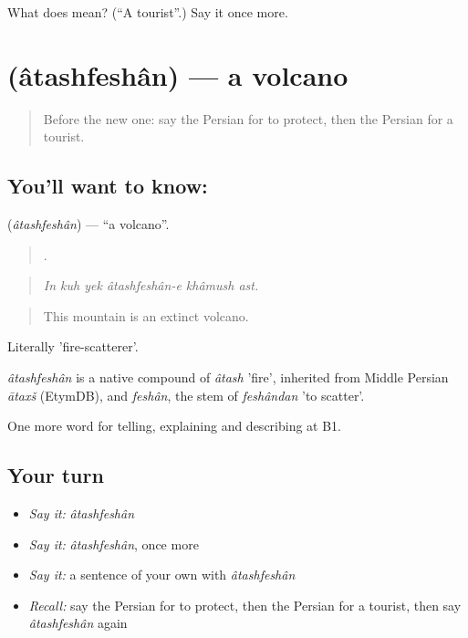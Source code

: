 \begin{tcolorbox}[breakable,colback=teal!4,colframe=teal!35!black,title={Before you move on}]
What does  mean? (\textquotedblleft{}A tourist\textquotedblright{}.) Say it once more.
\end{tcolorbox}
\section[\texorpdfstring{\fa{آتشفشان} (âtashfeshân)}{آتشفشان (âtashfeshân)}]{ (âtashfeshân) — a volcano}

\label{lesson:FA-C472-atashfeshan}



\begin{quote}
Before the new one: say the Persian for to protect, then the Persian for a tourist.
\end{quote}

\subsection*{You'll want to know: }
\textbf{} (\emph{âtashfeshân}) — \textquotedblleft{}a volcano\textquotedblright{}.

\begin{quote}
     .
\end{quote}

\begin{quote}
\emph{In kuh yek âtashfeshân-e khâmush ast.}
\end{quote}

\begin{quote}
This mountain is an extinct volcano.
\end{quote}

Literally 'fire-scatterer'.

\begin{cousinweb}
\emph{âtashfeshân} is a native compound of \emph{âtash} 'fire', inherited from Middle Persian \emph{ātaxš} (EtymDB), and \emph{feshân}, the stem of \emph{feshândan} 'to scatter'.
\end{cousinweb}

\begin{grammarlens}[title={What you've built}]
One more word for telling, explaining and describing at B1.
\end{grammarlens}

\subsection*{Your turn}
\begin{itemize}
\raggedright
  \item \emph{Say it:} \emph{âtashfeshân}
  \item \emph{Say it:} \emph{âtashfeshân}, once more
  \item \emph{Say it:} a sentence of your own with \emph{âtashfeshân}
  \item \emph{Recall:} say the Persian for to protect, then the Persian for a tourist, then say \emph{âtashfeshân} again
\end{itemize}

